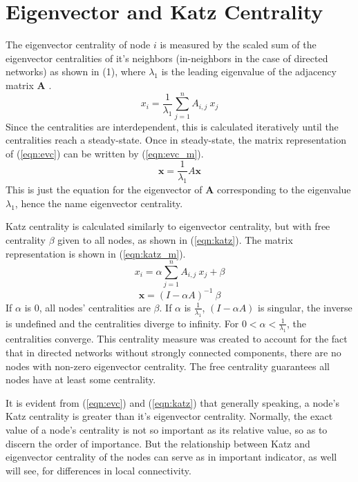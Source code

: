 \documentclass{IEEEtran}
\begin{document}
	\section{Eigenvector and Katz Centrality}
	\label{s:cent}
	The eigenvector centrality of node $i$ is measured by the scaled sum of the eigenvector centralities of it's neighbors (in-neighbors in the case of directed networks) as shown in (1), where $\lambda_1$ is the leading eigenvalue of the adjacency matrix $\mathbf{A}$ \cite{EVC}.
	\begin{equation}
	\label{eqn:evc}
	x_i = \frac{1}{\lambda_1}\sum_{j=1}^{n}A_{i,j}~x_j
	\end{equation}
	Since the centralities are interdependent, this is calculated iteratively until the centralities reach a steady-state. Once in steady-state, the matrix representation of (\ref{eqn:evc}) can be written by (\ref{eqn:evc_m}).
	\begin{equation}
	\label{eqn:evc_m}
	\mathbf{x} = \frac{1}{\lambda_1}A\mathbf{x}
	\end{equation}
	This is just the equation for the eigenvector of $\mathbf{A}$ corresponding to the eigenvalue $\lambda_1$, hence the name eigenvector centrality.
	
	Katz centrality is calculated similarly to eigenvector centrality, but with free centrality $\beta$ given to all nodes, as shown in (\ref{eqn:katz})\cite{katz}. The matrix representation is shown in (\ref{eqn:katz_m}).
	\begin{equation}
	\label{eqn:katz}
	x_i = \alpha\sum_{j=1}^{n}A_{i,j}~x_j + \beta
	\end{equation}
	\begin{equation}
	\label{eqn:katz_m}
	\mathbf{x} = (I-\alpha A)^{-1}~\beta
	\end{equation}
	If $\alpha$ is 0, all nodes' centralities are $\beta$. If $\alpha$ is $\frac{1}{\lambda_1}$, $(I-\alpha A)$ is singular, the inverse is undefined and the centralities diverge to infinity. For $0 < \alpha < \frac{1}{\lambda_1}$, the centralities converge. This centrality measure was created to account for the fact that in directed networks without strongly connected components, there are no nodes with non-zero eigenvector centrality. The free centrality guarantees all nodes have at least some centrality.
	
	It is evident from (\ref{eqn:evc}) and (\ref{eqn:katz}) that generally speaking, a node's Katz centrality is greater than it's eigenvector centrality. Normally, the exact value of a node's centrality is not so important as its relative value, so as to discern the order of importance. But the relationship between Katz and eigenvector centrality of the nodes can serve as in important indicator, as well will see, for differences in local connectivity.
	
\end{document}
